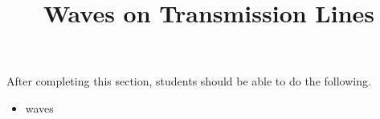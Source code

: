 \documentclass{ximera}
\title{Waves on Transmission Lines}
\begin{document}
\begin{abstract}
\end{abstract}

\maketitle

\begin{sectionOutcomes}

After completing this section, students should be able to do the following.

\begin{itemize}
\item waves
\end{itemize}

\end{sectionOutcomes}
\end{document}
